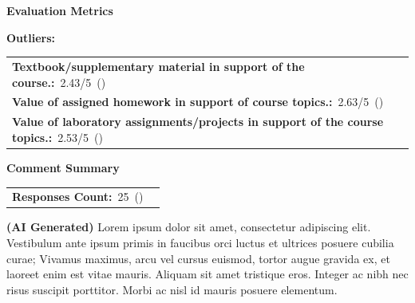 \documentclass[11pt]{article}
\newcommand{\CourseName}{CSE101}
\newcommand{\CourseYear}{2025}
\newcommand{\CourseTerm}{Fall C}
\newcommand{\CourseCode}{80312}
\newcommand{\Instructor}{John Smith}
\newcommand{\Responses}{25}
\newcommand{\ResponseDelta}{-5\%}
\newcommand{\OutOneName}{Textbook/supplementary material in support of the course.}
\newcommand{\OutOneScore}{2.43}
\newcommand{\OutOneDelta}{-2.07}
\newcommand{\OutTwoName}{Value of assigned homework in support of course topics.}
\newcommand{\OutTwoScore}{2.63}
\newcommand{\OutTwoDelta}{-1.87}
\newcommand{\OutThreeName}{Value of laboratory assignments/projects in support of the course topics.}
\newcommand{\OutThreeScore}{2.53}
\newcommand{\OutThreeDelta}{-1.97}
\newif\ifShowHdrEval
\newcommand{\CourseHeader}{\CourseName\ (\CourseYear\ \CourseTerm) \CourseCode\ \textendash\ \Instructor}
\newcommand{\posD}[1]{\textcolor{pos}{(#1)}}
\newcommand{\negD}[1]{\textcolor{neg}{(#1)}}
\newcommand{\neuD}[1]{\textcolor{neu}{(#1)}}
\newcommand{\autoD}[1]{%
	\IfStrEq{#1}{0}{\neuD{#1}}{%
	\IfStrEq{#1}{0\%}{\neuD{#1}}{%
	\IfStrEq{#1}{+0}{\neuD{#1}}{%
	\IfStrEq{#1}{+0\%}{\neuD{#1}}{%
	\IfStrEq{#1}{-0}{\neuD{#1}}{%
	\IfStrEq{#1}{-0\%}{\neuD{#1}}{%
	\IfBeginWith{#1}{+}{\posD{#1}}{%
	\IfBeginWith{#1}{-}{\negD{#1}}{\neuD{#1}}%
	}}}}}}}%
}
\newcommand{\MetricLeft}[3]{%
	\textbf{#1:}~#2\if\relax\detokenize{#3}\relax\else~(#3)\fi
}
\newlength{\DeltaColW}
\begin{document}
\begin{tcolorbox}
	{\Large\bfseries\textcolor{accent}{Evaluation Metrics}}
	\ifShowHdrEval\hfill\textbf{\CourseHeader}\fi

	\vspace{2pt}
	\textbf{Outliers:}

	\vspace{2pt}
	\renewcommand{\arraystretch}{1.2}
	\begin{tabularx}{\textwidth}{@{} >{\raggedright\arraybackslash}X >{\raggedleft\arraybackslash}p{\DeltaColW}@{}}
		\MetricLeft{\OutOneName}{\OutOneScore/5}{} & \autoD{\OutOneDelta}\\
		\MetricLeft{\OutTwoName}{\OutTwoScore/5}{} & \autoD{\OutTwoDelta}\\
		\MetricLeft{\OutThreeName}{\OutThreeScore/5}{} & \autoD{\OutThreeDelta}\\
	\end{tabularx}
\end{tcolorbox}

\begin{tcolorbox}
	{\Large\bfseries\textcolor{accent}{Comment Summary}}

	\vspace{2pt}
	\renewcommand{\arraystretch}{1.2}
	\begin{tabularx}{\textwidth}{@{} >{\raggedright\arraybackslash}X >{\raggedleft\arraybackslash}p{\DeltaColW}@{}}
		\MetricLeft{Responses Count}{\Responses}{} & \autoD{\ResponseDelta}\\
	\end{tabularx}

	\vspace{2pt}
    \textbf{(AI Generated)}
	\noindent Lorem ipsum dolor sit amet, consectetur adipiscing elit. Vestibulum ante ipsum primis in faucibus orci luctus et ultrices posuere cubilia curae; Vivamus maximus, arcu vel cursus euismod, tortor augue gravida ex, et laoreet enim est vitae mauris. Aliquam sit amet tristique eros. Integer ac nibh nec risus suscipit porttitor. Morbi ac nisl id mauris posuere elementum. %
\end{tcolorbox}
\end{document}
